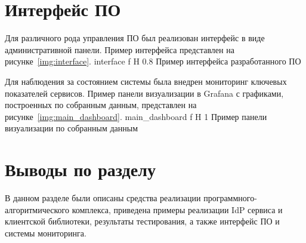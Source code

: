 \section{Интерфейс ПО}
Для различного рода управления ПО был реализован интерфейс в виде административной панели. Пример интерфейса представлен на рисунке~\ref{img:interface}.
    {interface}
    {f}
    {H}
    {0.8\textwidth}
    {Пример интерфейса разработанного ПО}
    
Для наблюдения за состоянием системы была внедрен мониторинг ключевых показателей сервисов. Пример панели визуализации в Grafana с графиками, построенных по собранным данным, представлен на рисунке~\ref{img:main_dashboard}.
    {main_dashboard}
    {f}
    {H}
    {1\textwidth}
    {Пример панели визуализации по собранным данным}

\section*{Выводы по разделу}
В данном разделе были описаны средства реализации программного-алгоритмического комплекса, приведена примеры реализации IdP сервиса и клиентской библиотеки, результаты тестирования, а также интерфейс ПО и системы мониторинга.

%	
%
%
